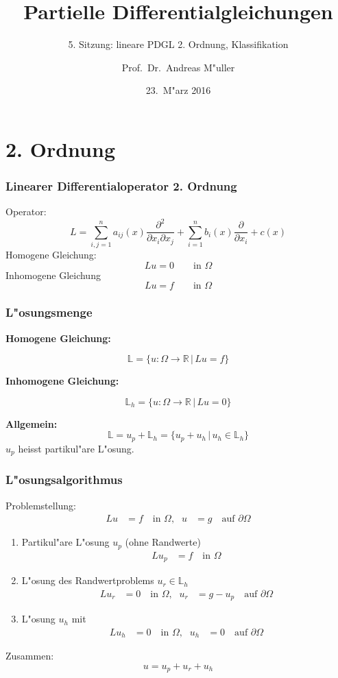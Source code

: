 \documentclass[handout]{beamer}
\title[]{Partielle Differentialgleichungen}
\subtitle{5. Sitzung: lineare PDGL 2. Ordnung, Klassifikation}
\date[23.~M"arz 2016]{23.~M"arz 2016}
\author{Prof.~Dr.~Andreas M"uller}
\begin{document}
\begin{frame}
\titlepage

\end{frame}

\section{2. Ordnung}

\begin{frame}
\frametitle{Linearer Differentialoperator 2. Ordnung}
Operator:
\[
L
=
\sum_{i,j=1}^n a_{ij}(x)\frac{\partial^2}{\partial x_i\partial x_j}
+
\sum_{i=1}^n b_i(x)\frac{\partial}{\partial x_i}
+
c(x)
\]
Homogene Gleichung:
\[
Lu=0\qquad\text{in $\Omega$}
\]
Inhomogene Gleichung
\[
Lu=f\qquad\text{in $\Omega$}
\]
\end{frame}

\begin{frame}
\frametitle{L"osungsmenge}
{\bf Homogene Gleichung:}

\[
{\mathbb L}
=\{
u\colon \Omega\to \mathbb R\,|\, Lu=f
\}
\]

\bigskip

{\bf Inhomogene Gleichung:}

\[
{\mathbb L}_h
=\{
u\colon \Omega\to \mathbb R\,|\, Lu=0
\}
\]

{\bf Allgemein:}
\[
{\mathbb L} = u_p + {\mathbb L}_h
=\{u_p+u_h\,|\,u_h\in\mathbb L_h\}
\]
$u_p$ heisst partikul"are L"osung.

\end{frame}

\begin{frame}
\frametitle{L"osungsalgorithmus}
Problemstellung:
\begin{align*}
Lu&=f\quad\text{in $\Omega$,}
&
 u&=g\quad\text{auf $\partial\Omega$}
\end{align*}

\begin{enumerate}
\item Partikul"are L"osung $u_p$ (ohne Randwerte)
\begin{align*}
Lu_p&=f\quad\text{in $\Omega$}
\end{align*}
\item
L"osung des Randwertproblems $u_r\in\mathbb L_h$
\begin{align*}
Lu_r&=0    \quad\text{in $\Omega$,}&
 u_r&=g-u_p\quad\text{auf $\partial\Omega$}
\end{align*}
\item
L"osung $u_h$ mit
\begin{align*}
Lu_h&=0\quad\text{in $\Omega$,}
&
 u_h&=0\quad\text{auf $\partial\Omega$}
\end{align*}
\end{enumerate}
Zusammen:
\[
u = u_p+u_r+u_h
\]
\end{frame}
\end{document}
